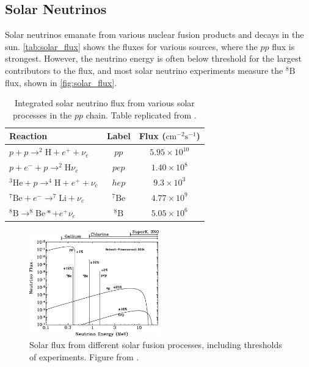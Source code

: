 \subsection{Solar Neutrinos}
Solar neutrinos emanate from various nuclear fusion products and decays in the sun. \autoref{tab:solar_flux} shows the fluxes for various sources, where the $pp$ flux is strongest. However, the neutrino energy is often below threshold for the largest contributors to the flux, and most solar neutrino experiments measure the $^{8}\text{B}$ flux, shown in \autoref{fig:solar_flux}.
\begin{table}[h]
	\begin{tabular}{l | c c}
		\hline
		\hline
		Reaction & Label & Flux ($\text{cm}^{-2} \text{s}^{-1}$) \\
		\hline
		$p+p\rightarrow ^{2}\text{H} + e^+ + \nu_e$ & $pp$ & $5.95\times10^{10}$ \\
		$p+e^-+p\rightarrow ^{2}\text{H} \nu_e$ & $pep$ & $1.40\times10^{8}$ \\
		$^{3}\text{He} + p\rightarrow ^{4}\text{H} + e^+ + \nu_e$ & $hep$ & $9.3\times10^{3}$ \\
		$^{7}\text{Be} + e^- \rightarrow ^{7}\text{Li} + \nu_e$ & $^{7}\text{Be}$ & $4.77\times10^{9}$ \\
		$^{8}\text{B} \rightarrow ^{8}\text{Be}* + e^+ \nu_e$ & $^{8}\text{B}$ & $5.05\times10^{6}$ \\
		\hline
		\hline
	\end{tabular}
	\caption{Integrated solar neutrino flux from various solar processes in the $pp$ chain. Table replicated from \cite{solar_review}.}
	\label{tab:solar_flux}
\end{table}

\begin{figure}[h]
	\includegraphics[width=0.5\textwidth, trim={0mm 0mm 0mm 0mm}, clip,page=1]{figures/theory/solar_flux}
	\caption{Solar flux from different solar fusion processes, including thresholds of experiments. Figure from \cite{sno_solar_flux}.}
	\label{fig:solar_flux}
\end{figure}

